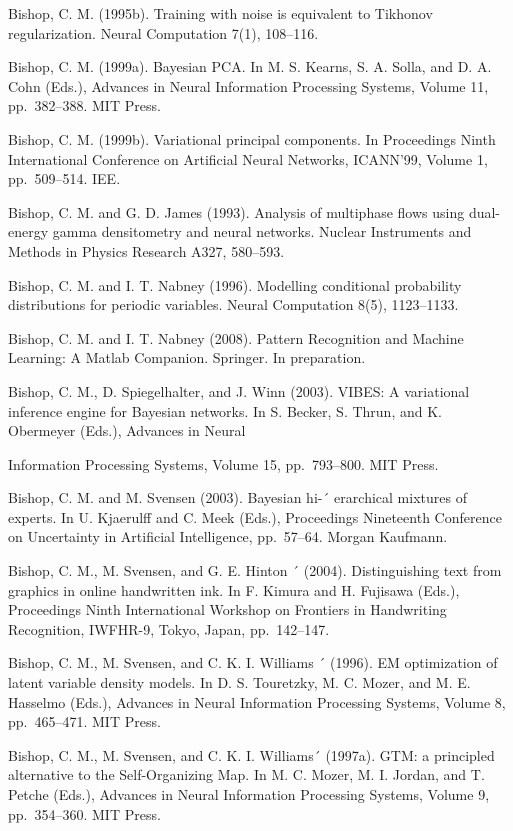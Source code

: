\documentclass[
  10
]{article}
\begin{document}
Bishop, C. M. (1995b). Training with noise is equivalent to Tikhonov
regularization. Neural Computation 7(1), 108--116.

Bishop, C. M. (1999a). Bayesian PCA. In M. S. Kearns, S. A. Solla, and
D. A. Cohn (Eds.), Advances in Neural Information Processing Systems,
Volume 11, pp.~382--388. MIT Press.

Bishop, C. M. (1999b). Variational principal components. In Proceedings
Ninth International Conference on Artificial Neural Networks, ICANN'99,
Volume 1, pp.~509--514. IEE.

Bishop, C. M. and G. D. James (1993). Analysis of multiphase flows using
dual-energy gamma densitometry and neural networks. Nuclear Instruments
and Methods in Physics Research A327, 580--593.

Bishop, C. M. and I. T. Nabney (1996). Modelling conditional probability
distributions for periodic variables. Neural Computation 8(5),
1123--1133.

Bishop, C. M. and I. T. Nabney (2008). Pattern Recognition and Machine
Learning: A Matlab Companion. Springer. In preparation.

Bishop, C. M., D. Spiegelhalter, and J. Winn (2003). VIBES: A
variational inference engine for Bayesian networks. In S. Becker, S.
Thrun, and K. Obermeyer (Eds.), Advances in Neural

Information Processing Systems, Volume 15, pp.~793--800. MIT Press.

Bishop, C. M. and M. Svensen (2003). Bayesian hi-´ erarchical mixtures
of experts. In U. Kjaerulff and C. Meek (Eds.), Proceedings Nineteenth
Conference on Uncertainty in Artificial Intelligence, pp.~57--64. Morgan
Kaufmann.

Bishop, C. M., M. Svensen, and G. E. Hinton ´ (2004). Distinguishing
text from graphics in online handwritten ink. In F. Kimura and H.
Fujisawa (Eds.), Proceedings Ninth International Workshop on Frontiers
in Handwriting Recognition, IWFHR-9, Tokyo, Japan, pp.~142--147.

Bishop, C. M., M. Svensen, and C. K. I. Williams ´ (1996). EM
optimization of latent variable density models. In D. S. Touretzky, M.
C. Mozer, and M. E. Hasselmo (Eds.), Advances in Neural Information
Processing Systems, Volume 8, pp.~465--471. MIT Press.

Bishop, C. M., M. Svensen, and C. K. I. Williams´ (1997a). GTM: a
principled alternative to the Self-Organizing Map. In M. C. Mozer, M. I.
Jordan, and T. Petche (Eds.), Advances in Neural Information Processing
Systems, Volume 9, pp.~354--360. MIT Press.
\end{document}
